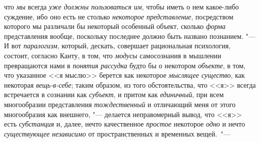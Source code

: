 что {\em мы}
всегда {\em уже должны
пользоваться им}, чтобы иметь о нем какое-либо суждение, ибо
оно есть не столько {\em некоторое
представление}, посредством которого мы различали бы
некоторый особенный объект, сколько
{\em форма} представления
вообще, поскольку последнее должно быть названо познанием. "---
И вот {\em паралогизм},
который, дескать, совершает рациональная психология, состоит,
согласно Канту, в том, что {\em модусы}
самосознания в мышлении превращаются нами в
{\em понятия рассудка}
будто бы о некотором
{\em объекте}, в том, что
указанное <<я мыслю>> берется как некоторое
{\em мыслящее существо},
как некоторая
{\em вещь-в-себе}; таким
образом, из того обстоятельства, что <<я>> всегда встречается в сознании
как {\em субъект},
и притом как
{\em единичный}, при всем
многообразии представления
{\em тождественный} и
отличающий меня от этого многообразия как внешнего, "---
делается неправомерный вывод, что <<я>> есть
{\em субстанция} и,
далее, нечто качественное {\em простое}
некоторое {\em одно}
и нечто {\em существующее
независимо} от пространственных и временных
вещей.~"---

